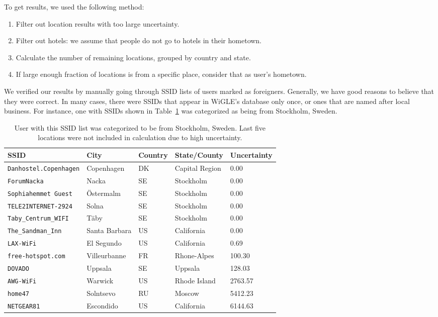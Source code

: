 \documentclass[12pt,a4paper,oneside,pdftex]{report}
\begin{document}
To get results, we used the following method:
\begin{enumerate}
    \item Filter out location results with too large uncertainty.
    \item Filter out hotels: we assume that people do not go to hotels in their hometown.
    \item Calculate the number of remaining locations, grouped by country and state.
    \item If large enough fraction of locations is from a specific place, consider that as user's hometown.
\end{enumerate}

We verified our results by manually going through SSID lists of users marked as foreigners. Generally, we have good reasons to believe that they were correct. In many cases, there were SSIDs that appear in WiGLE's database only once, or ones that are named after local business. For instance, one with SSIDs shown in Table~\ref{tab:example_hometown} was categorized as being from Stockholm, Sweden.

\begin{table}
\center
    \begin{tabular}{| *{5}{l} |}
\hline
\textbf{SSID} & \textbf{City} & \textbf{Country} & \textbf{State/County} & \textbf{Uncertainty}  \\ \hline
\texttt{Danhostel.Copenhagen} & Copenhagen    & DK      & Capital Region & 0.00 \\ 
\hline
\texttt{ForumNacka}           & Nacka         & SE      & Stockholm      & 0.00 \\ 
\hline
\texttt{Sophiahemmet Guest}   & \"{O}stermalm     & SE      & Stockholm      & 0.00 \\ 
\hline
\texttt{TELE2INTERNET-2924}   & Solna         & SE      & Stockholm      & 0.00 \\ 
\hline
\texttt{Taby\_Centrum\_WIFI}  & T\"{a}by          & SE      & Stockholm      & 0.00 \\ 
\hline
\texttt{The\_Sandman\_Inn}    & Santa Barbara & US      & California     & 0.00 \\ 
\hline
\texttt{LAX-WiFi}             & El Segundo    & US      & California     & 0.69 \\ 
\hline
\texttt{free-hotspot.com}     & Villeurbanne  & FR      & Rhone-Alpes    & 100.30 \\ 
\hline
\texttt{DOVADO}               & Uppsala       & SE      & Uppsala        & 128.03 \\ 
\hline
\texttt{AWG-WiFi}             & Warwick       & US      & Rhode Island   & 2763.57 \\ 
\hline
\texttt{home47}               & Solntsevo     & RU      & Moscow         & 5412.23 \\ 
\hline
\texttt{NETGEAR81}            & Escondido     & US      & California     & 6144.63 \\ 
\hline
    \end{tabular}
    \caption{User with this SSID list was categorized to be from Stockholm, Sweden. Last five locations were not included in calculation due to high uncertainty.}
    \label{tab:example_hometown}
\end{table}
\end{document}
